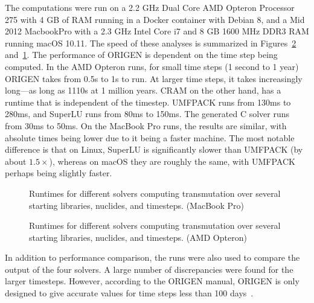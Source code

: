 The computations were run on a 2.2 GHz Dual Core AMD Opteron Processor 275
with 4 GB of RAM running in a Docker container with Debian 8, %
and a Mid 2012 MacbookPro with a 2.3 GHz Intel Core i7 and 8 GB 1600 MHz DDR3
RAM running macOS 10.11. %
The speed of these analyses is summarized in Figures~\ref{fig:origen-meeseeks}
and~\ref{fig:origen-aaron}. The performance of ORIGEN is dependent on the time
step being computed. In the AMD Opteron runs, for small time steps (1 second
to 1 year) ORIGEN takes from 0.5\;s to 1\;s to run. At larger time steps, it
takes increasingly long---as long as 1110\;s at 1 million years. CRAM on the
other hand, has a runtime that is independent of the timestep. UMFPACK runs
from 130\;ms to 280\;ms, and SuperLU runs from 80\;ms to 150\;ms. The
generated C solver runs from 30\;ms to 50\;ms. On the MacBook Pro runs, the
results are similar, with absolute times being lower due to it being a faster
machine. The most notable difference is that on Linux, SuperLU is
significantly slower than UMFPACK (by about $1.5\times$), whereas on macOS
they are roughly the same, with UMFPACK perhaps being slightly faster.


\begin{figure}[!ht]
\centering
\resizebox{0.9\textwidth}{!}{}
\caption{Runtimes for different solvers computing transmutation over several starting libraries, nuclides, and timesteps.
 (MacBook Pro)}
\label{fig:origen-aaron}
\end{figure}

\begin{figure}[!ht]
\centering
\resizebox{0.9\textwidth}{!}{}
\caption{Runtimes for different solvers computing transmutation over several starting libraries, nuclides, and timesteps.
 (AMD Opteron)}
\label{fig:origen-meeseeks}
\end{figure}

In addition to performance comparison, the runs were also used to compare the
output of the four solvers. A large number of discrepancies were found for the
larger timesteps. However, according to the ORIGEN manual, ORIGEN is only
designed to give accurate values for time steps less than 100
days~\cite{ationneeded}.

